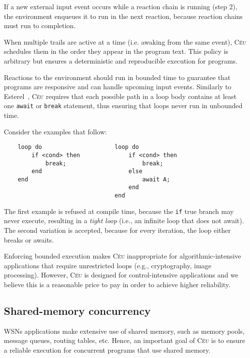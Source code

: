 \documentclass[10pt]{sensys-proc}
\newcommand{\CEU}{\textsc{C\'{e}u}\xspace}
\newcommand{\code}[1] {{\small{\texttt{#1}}}}
\begin{document}
If a new external input event occurs while a reaction chain is running (step 
2), the environment enqueues it to run in the next reaction, because reaction 
chains must run to completion.


When multiple trails are active at a time (i.e. awaking from the same event), 
\CEU schedules them in the order they appear in the program text.
This policy is arbitrary but ensures a deterministic and reproducible execution 
for programs.

Reactions to the environment should run in bounded time to guarantee that 
programs are responsive and can handle upcoming input events.
Similarly to Esterel~\cite{esterel.ieee91}, \CEU requires that each possible 
path in a loop body contains at least one \code{await} or \code{break} 
statement, thus ensuring that loops never run in unbounded time.

Consider the examples that follow:

{\small
\begin{verbatim}
    loop do                     loop do
        if <cond> then              if <cond> then
            break;                      break;
        end                         else
    end                                 await A;
                                    end
                                end
\end{verbatim}
}

The first example is refused at compile time, because the \code{if} true branch 
may never execute, resulting in a \emph{tight loop} (i.e., an infinite loop 
that does not await).
The second variation is accepted, because for every iteration, the loop either 
breaks or awaits.

Enforcing bounded execution makes \CEU inappropriate for algorithmic-intensive 
applications that require unrestricted loops (e.g., cryptography, image 
processing).
However, \CEU is designed for control-intensive applications and we believe 
this is a reasonable price to pay in order to achieve higher reliability.


\subsection{Shared-memory concurrency}
\label{sec.ceu.shared}

WSNs applications make extensive use of shared memory, such as memory pools, 
message queues, routing tables, etc.
Hence, an important goal of \CEU is to ensure a reliable execution for 
concurrent programs that use shared memory.
\end{document}
